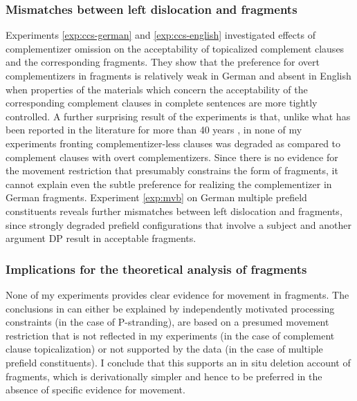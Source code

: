 \subsubsection{Mismatches between left dislocation and fragments}
Experiments \ref{exp:ccs-german} and \ref{exp:ccs-english} investigated effects of complementizer omission on the acceptability of topicalized complement clauses and the corresponding fragments. They show that the preference for overt complementizers in fragments is relatively weak in German and absent in English when properties of the materials which concern the acceptability of the corresponding complement clauses in complete sentences are more tightly controlled. A further surprising result of the experiments is that, unlike what has been reported in the literature for more than 40 years \citep{morgan1973, stowell1981, webelhuth1992, merchant2004}, in none of my experiments fronting complementizer-less clauses was degraded as compared to complement clauses with overt complementizers. Since there is no evidence for the movement restriction that presumably constrains the form of fragments, it cannot explain even the subtle preference for realizing the complementizer in German fragments. Experiment \ref{exp:mvb} on German multiple prefield constituents reveals further mismatches between left dislocation and fragments, since strongly degraded prefield configurations that involve a subject and another argument DP result in acceptable fragments.

\subsubsection{Implications for the theoretical analysis of fragments}
None of my experiments provides clear evidence for movement in fragments. The conclusions in \citet{merchant.etal2013} can either be explained by independently motivated processing constraints (in the case of P-stranding), are based on a presumed movement restriction that is not reflected in my experiments (in the case of complement clause topicalization) or not supported by the data (in the case of multiple prefield constituents). I conclude that this supports an in situ deletion account of fragments, which is derivationally simpler and hence to be preferred in the absence of specific evidence for movement.

